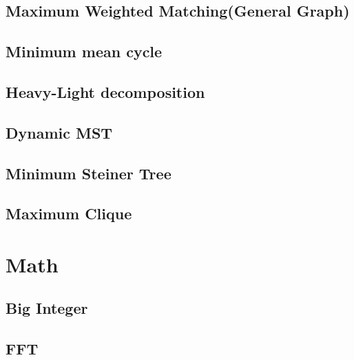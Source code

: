 \documentclass[a4paper,10pt,twocolumn,oneside]{article}
\begin{document}
\subsection{Maximum Weighted Matching(General Graph)}


%

\subsection{Minimum mean cycle}


\subsection{Heavy-Light decomposition}


\subsection{Dynamic MST}


\subsection{Minimum Steiner Tree}


\subsection{Maximum Clique}


\section{Math}
\subsection{Big Integer}


\subsection{FFT}

\end{document}

